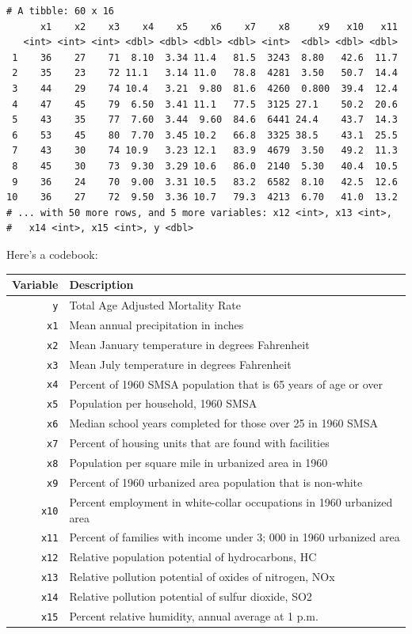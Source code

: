 \documentclass[]{book}
\theoremstyle{definition}
\theoremstyle{definition}
\theoremstyle{definition}
\theoremstyle{remark}
\begin{document}
\begin{verbatim}
# A tibble: 60 x 16
      x1    x2    x3    x4    x5    x6    x7    x8     x9   x10   x11
   <int> <int> <int> <dbl> <dbl> <dbl> <dbl> <int>  <dbl> <dbl> <dbl>
 1    36    27    71  8.10  3.34 11.4   81.5  3243  8.80   42.6  11.7
 2    35    23    72 11.1   3.14 11.0   78.8  4281  3.50   50.7  14.4
 3    44    29    74 10.4   3.21  9.80  81.6  4260  0.800  39.4  12.4
 4    47    45    79  6.50  3.41 11.1   77.5  3125 27.1    50.2  20.6
 5    43    35    77  7.60  3.44  9.60  84.6  6441 24.4    43.7  14.3
 6    53    45    80  7.70  3.45 10.2   66.8  3325 38.5    43.1  25.5
 7    43    30    74 10.9   3.23 12.1   83.9  4679  3.50   49.2  11.3
 8    45    30    73  9.30  3.29 10.6   86.0  2140  5.30   40.4  10.5
 9    36    24    70  9.00  3.31 10.5   83.2  6582  8.10   42.5  12.6
10    36    27    72  9.50  3.36 10.7   79.3  4213  6.70   41.0  13.2
# ... with 50 more rows, and 5 more variables: x12 <int>, x13 <int>,
#   x14 <int>, x15 <int>, y <dbl>
\end{verbatim}

Here's a codebook:

\begin{longtable}[]{@{}rl@{}}
\toprule
Variable & Description\tabularnewline
\midrule
\endhead
\texttt{y} & Total Age Adjusted Mortality Rate\tabularnewline
\texttt{x1} & Mean annual precipitation in inches\tabularnewline
\texttt{x2} & Mean January temperature in degrees
Fahrenheit\tabularnewline
\texttt{x3} & Mean July temperature in degrees Fahrenheit\tabularnewline
\texttt{x4} & Percent of 1960 SMSA population that is 65 years of age or
over\tabularnewline
\texttt{x5} & Population per household, 1960 SMSA\tabularnewline
\texttt{x6} & Median school years completed for those over 25 in 1960
SMSA\tabularnewline
\texttt{x7} & Percent of housing units that are found with
facilities\tabularnewline
\texttt{x8} & Population per square mile in urbanized area in
1960\tabularnewline
\texttt{x9} & Percent of 1960 urbanized area population that is
non-white\tabularnewline
\texttt{x10} & Percent employment in white-collar occupations in 1960
urbanized area\tabularnewline
\texttt{x11} & Percent of families with income under 3; 000 in 1960
urbanized area\tabularnewline
\texttt{x12} & Relative population potential of hydrocarbons,
HC\tabularnewline
\texttt{x13} & Relative pollution potential of oxides of nitrogen,
NOx\tabularnewline
\texttt{x14} & Relative pollution potential of sulfur dioxide,
SO2\tabularnewline
\texttt{x15} & Percent relative humidity, annual average at 1
p.m.\tabularnewline
\bottomrule
\end{longtable}
\end{document}
